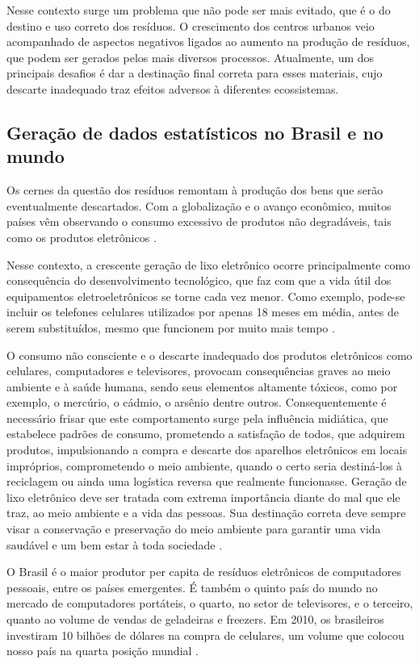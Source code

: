 \documentclass[
	12pt,				%
	openany,			%
	twoside,			%
	a4paper,			%
	english,			%
	french,				%
	spanish,			%
	brazil				%
	]{abntex2}
\begin{document}
Nesse contexto surge um problema que não pode ser mais evitado, que é o do destino e uso correto dos resíduos. O crescimento dos centros urbanos veio acompanhado de aspectos negativos ligados ao aumento na produção de resíduos, que podem ser gerados pelos mais diversos processos. Atualmente, um dos principais desafios é dar a destinação final correta para esses materiais, cujo descarte inadequado traz efeitos adversos à diferentes ecossistemas.

\subsection{Geração de dados estatísticos no Brasil e no mundo}
Os cernes da questão dos resíduos remontam à produção dos bens que serão eventualmente descartados. Com a globalização e o avanço econômico, muitos países vêm observando o consumo excessivo de produtos não degradáveis, tais como os produtos eletrônicos \cite{esc}.

Nesse contexto, a crescente geração de lixo eletrônico ocorre principalmente como consequência do desenvolvimento tecnológico, que faz com que a vida útil dos equipamentos eletroeletrônicos se torne cada vez menor. Como exemplo, pode-se incluir os telefones celulares utilizados por apenas 18 meses em média, antes de serem substituídos, mesmo que funcionem por muito mais tempo \cite{oicd}.

O consumo não consciente e o descarte inadequado dos produtos eletrônicos como celulares, computadores e televisores, provocam consequências graves ao meio ambiente e à saúde humana, sendo seus elementos altamente tóxicos, como por exemplo, o mercúrio, o cádmio, o arsênio dentre outros. Consequentemente é necessário frisar que este comportamento surge pela influência midiática, que estabelece padrões de consumo, prometendo a satisfação de todos, que adquirem produtos, impulsionando a compra e descarte dos aparelhos eletrônicos em locais impróprios, comprometendo o meio ambiente, quando o certo seria destiná-los à reciclagem ou ainda uma logística reversa que realmente funcionasse. Geração de lixo eletrônico deve ser tratada com extrema importância diante do mal que ele traz, ao meio ambiente e a vida das pessoas. Sua destinação correta deve sempre visar a conservação e preservação do meio ambiente para garantir uma vida saudável e um bem estar à toda sociedade \cite{vbo_aa_ntn}.

O Brasil é o maior produtor per capita de resíduos eletrônicos de computadores pessoais, entre os países emergentes.
É também o quinto país do mundo no mercado de computadores portáteis, o quarto, no setor de televisores, e o terceiro, quanto ao volume de vendas de geladeiras e freezers. Em 2010, os brasileiros investiram 10 bilhões de dólares na compra de celulares, um volume que colocou nosso país na quarta posição mundial \cite{vbd}.
\end{document}
